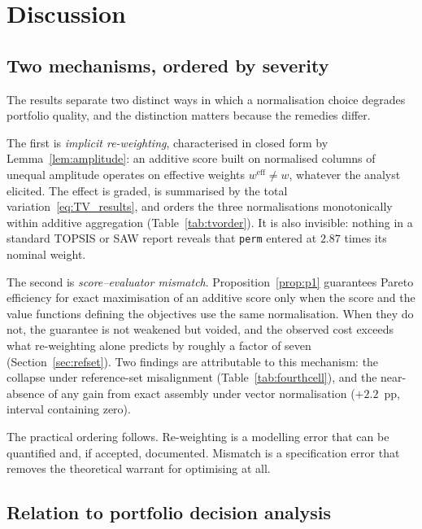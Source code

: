 
\section{Discussion}
\label{sec:discussion}

\subsection{Two mechanisms, ordered by severity}

The results separate two distinct ways in which a normalisation choice
degrades portfolio quality, and the distinction matters because the
remedies differ.

The first is \emph{implicit re-weighting}, characterised in closed form
by Lemma~\ref{lem:amplitude}: an additive score built on normalised
columns of unequal amplitude operates on effective weights
$w^{\mathrm{eff}}\neq w$, whatever the analyst elicited.
The effect is graded, is summarised by the total
variation~\eqref{eq:TV_results}, and orders the three normalisations
monotonically within additive aggregation (Table~\ref{tab:tvorder}).
It is also invisible: nothing in a standard TOPSIS or SAW report reveals
that \texttt{perm} entered at $2.87$ times its nominal weight.

The second is \emph{score--evaluator mismatch}.
Proposition~\ref{prop:p1} guarantees Pareto efficiency for exact
maximisation of an additive score only when the score and the value
functions defining the objectives use the same normalisation.
When they do not, the guarantee is not weakened but voided, and the
observed cost exceeds what re-weighting alone predicts by roughly a
factor of seven (Section~\ref{sec:refset}).
Two findings are attributable to this mechanism: the collapse under
reference-set misalignment (Table~\ref{tab:fourthcell}), and the
near-absence of any gain from exact assembly under vector normalisation
($+2.2$~pp, interval containing zero).

The practical ordering follows.
Re-weighting is a modelling error that can be quantified and, if
accepted, documented.
Mismatch is a specification error that removes the theoretical warrant
for optimising at all.

\subsection{Relation to portfolio decision analysis}

